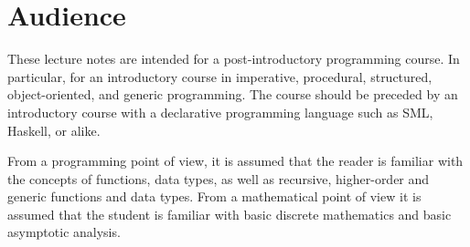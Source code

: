 \section{Audience}

These lecture notes are intended for a post-introductory programming course. In
particular, for an introductory course in imperative, procedural, structured,
object-oriented, and generic programming. The course should be preceded by an
introductory course with a declarative programming language such as SML,
Haskell, or alike.

From a programming point of view, it is assumed that the reader is familiar
with the concepts of functions, data types, as well as recursive, higher-order
and generic functions and data types. From a mathematical point of view it is
assumed that the student is familiar with basic discrete mathematics and basic
asymptotic analysis.
